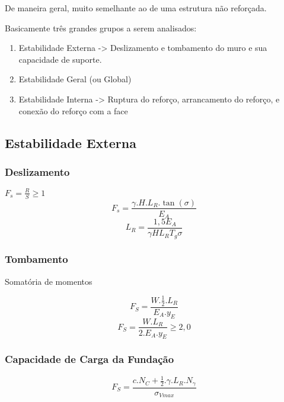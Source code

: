 De maneira geral, muito semelhante ao de uma estrutura não reforçada.

Basicamente três grandes grupos a serem analisados:
\begin{enumerate}
    \item Estabilidade Externa -> Deslizamento e  tombamento do muro e sua capacidade de suporte.
    \item Estabilidade Geral (ou Global)
    \item Estabilidade Interna -> Ruptura do reforço, arrancamento do reforço, e conexão do reforço com a face
\end{enumerate}

\subsection{Estabilidade Externa}

\subsubsection{Deslizamento}
$F_s = \frac{R}{S} \geq 1$
\begin{equation*}
    F_s= \frac{\gamma . H . L_R . \tan(\sigma)}{E_A}
\end{equation*}
\begin{equation*}
    L_R = \frac{1,5 E_A}{\gamma H L_R T_g \sigma}
\end{equation*}

\subsubsection{Tombamento}
 Somatória de momentos
 
 \begin{equation*}
     F_S = \frac{W . \tfrac{1}{2} . L_R}{E_A . y_E}
 \end{equation*}
 \begin{equation*}
     F_S = \frac{W . L_R}{2 . E_A . y_E} \geq 2,0
 \end{equation*}
 
 
 \subsubsection{Capacidade de Carga da Fundação}
 
 \begin{equation*}
     F_S = \frac{c . N_C + \tfrac{1}{2} . \gamma . L_R . N_\gamma}{\sigma_{Vmax}}
 \end{equation*}
 
